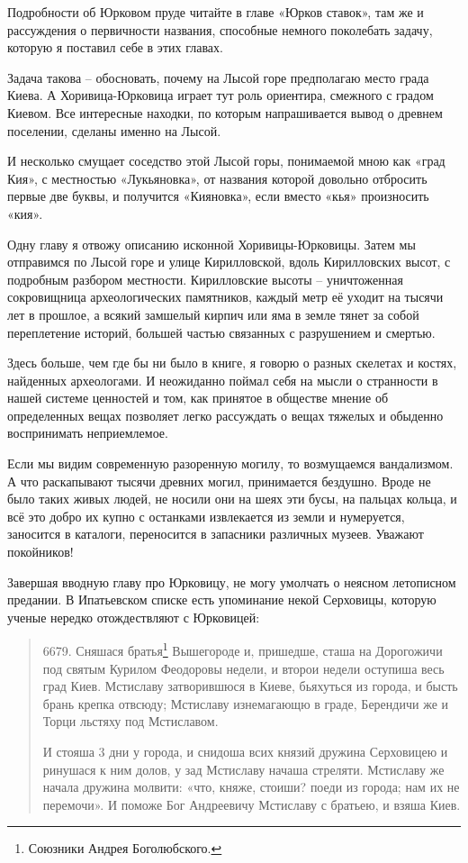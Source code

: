 Подробности об Юрковом пруде читайте в главе «Юрков ставок», там же и рассуждения о первичности названия, способные немного поколебать задачу, которую я поставил себе в этих главах.

Задача такова – обосновать, почему на Лысой горе предполагаю место града Киева. А Хоривица-Юрковица играет тут роль ориентира, смежного с градом Киевом. Все интересные находки, по которым напрашивается вывод о древнем поселении, сделаны именно на Лысой. 

И несколько смущает соседство этой Лысой горы, понимаемой мною как «град Кия», с местностью «Лукьяновка», от названия которой довольно отбросить первые две буквы, и получится «Кияновка», если вместо «кья» произносить «кия».

Одну главу я отвожу описанию исконной Хоривицы-Юрковицы. Затем мы отправимся по Лысой горе и улице Кирилловской, вдоль Кирилловских высот, с подробным разбором местности. Кирилловские высоты – уничтоженная сокровищница археологических памятников, каждый метр её уходит на тысячи лет в прошлое, а всякий замшелый кирпич или яма в земле тянет за собой переплетение историй, большей частью связанных с разрушением и смертью.

Здесь больше, чем где бы ни было в книге, я говорю о разных скелетах и костях, найденных археологами. И неожиданно поймал себя на мысли о странности в нашей системе ценностей и том, как принятое в обществе мнение об определенных вещах позволяет легко рассуждать о вещах тяжелых и обыденно воспринимать неприемлемое.

Если мы видим современную разоренную могилу, то возмущаемся вандализмом. А что раскапывают тысячи древних могил, принимается бездушно. Вроде не было таких живых людей, не носили они на шеях эти бусы, на пальцах кольца, и всё это добро их купно с останками извлекается из земли и нумеруется, заносится в каталоги, переносится в запасники различных музеев. Уважают покойников!

Завершая вводную главу про Юрковицу, не могу умолчать о неясном летописном предании. В Ипатьевском списке есть упоминание некой Серховицы, которую ученые нередко отождествляют с Юрковицей:

\begin{quotation}
6679. Сняшася братья\footnote{Союзники Андрея Боголюбского.} Вышегороде и, пришедше, сташа на Дорогожичи под святым Курилом Феодоровы недели, и второи недели оступиша весь град Киев. Мстиславу затворившюся в Киеве, бьяхуться из города, и бысть брань крепка отвсюду; Мстиславу изнемагающю в граде, Берендичи же и Торци льстяху под Мстиславом. 

И стояша 3 дни у города, и снидоша всих князий дружина Серховицею и ринушася к ним долов, у зад Мстиславу начаша стреляти. Мстиславу же начала дружина молвити: «что, княже, стоиши? поеди из города; нам их не перемочи». И поможе Бог Андреевичу Мстиславу с братьею, и взяша Киев.
\end{quotation}

